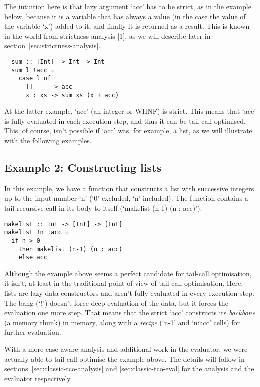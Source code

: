 \documentclass[diploma]{softlab-thesis}
\begin{document}
The intuition here is that lazy argument `acc' has to be strict, as in the example below,
because it is a variable that has always a value (in the case the value of the variable `x') added to it,
and finally it is returned as a result. This is known in the world from strictness analysis [1], as we 
will describe later in section~\ref{sec:strictness-analysis}.

\begin{verbatim}
  sum :: [Int] -> Int -> Int
  sum l !acc = 
    case l of 
      []     -> acc 
      x : xs -> sum xs (x + acc) 
\end{verbatim}

At the latter example, `acc' (an integer or WHNF) is strict. This means that `acc' is 
fully evaluated in each execution step, and thus it can be tail-call optimised. This, of course,
isn't possible if `acc' was, for example, a list, as we will illustrate with the following examples.


\subsection {Example 2: Constructing lists}
\label{sec:example2}

In this example, we have a function that constructs a list with successive 
integers up to the input number `n' (`0' excluded, `n' included). The function contains 
a tail-recursive call in its body to itself (`makelist (n-1) (n : acc)'). 

\begin{verbatim}
makelist :: Int -> [Int] -> [Int]
makelist !n !acc = 
  if n > 0 
    then makelist (n-1) (n : acc)
    else acc
\end{verbatim}

Although the example above seems a perfect candidate for tail-call optimisation, it isn't, 
at least in the traditional point of view of tail-call optimisation. Here, lists are 
lazy data constructors and aren't fully evaluated in every execution step. The bang (`!') doesn't 
force deep evaluation of the data, but it forces the evaluation one more step. That means that the strict 
`acc' constructs its \textit{backbone} (a memory thunk) in memory, along with a \textit{recipe} 
(`n-1' and `n:acc' cells) for further evaluation. 

With a more case-aware analysis and additional work in the evaluator, 
we were actually able to tail-call optimise the example
above. The details will follow in sections~\ref{sec:classic-tco-analysis} and \ref{sec:classic-tco-eval} for the analysis 
and the evaluator respectively.
\end{document}
